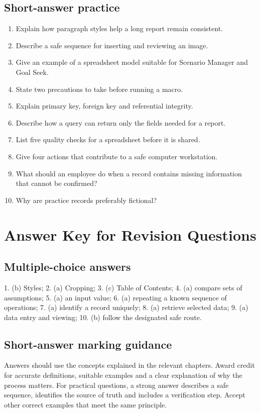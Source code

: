 \documentclass[11pt,openany,oneside]{book}
\begin{document}
\section{Short-answer practice}
\begin{enumerate}
\item Explain how paragraph styles help a long report remain consistent.
\item Describe a safe sequence for inserting and reviewing an image.
\item Give an example of a spreadsheet model suitable for Scenario Manager and Goal Seek.
\item State two precautions to take before running a macro.
\item Explain primary key, foreign key and referential integrity.
\item Describe how a query can return only the fields needed for a report.
\item List five quality checks for a spreadsheet before it is shared.
\item Give four actions that contribute to a safe computer workstation.
\item What should an employee do when a record contains missing information that cannot be confirmed?
\item Why are practice records preferably fictional?
\end{enumerate}
\chapter{Answer Key for Revision Questions}
\section{Multiple-choice answers}
1. (b) Styles; 2. (a) Cropping; 3. (c) Table of Contents; 4. (a) compare sets of assumptions; 5. (a) an input value; 6. (a) repeating a known sequence of operations; 7. (a) identify a record uniquely; 8. (a) retrieve selected data; 9. (a) data entry and viewing; 10. (b) follow the designated safe route.
\section{Short-answer marking guidance}
Answers should use the concepts explained in the relevant chapters. Award credit for accurate definitions, suitable examples and a clear explanation of why the process matters. For practical questions, a strong answer describes a safe sequence, identifies the source of truth and includes a verification step. Accept other correct examples that meet the same principle.
\backmatter
\end{document}
